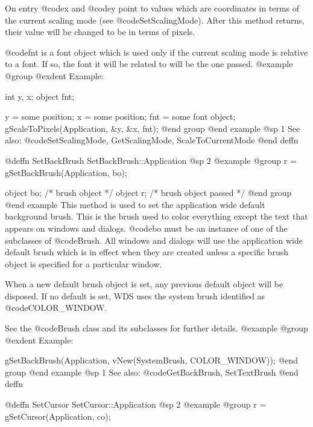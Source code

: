 On entry @code{x} and @code{y} point to values which are coordinates
in terms of the current scaling mode (see @code{SetScalingMode}).
After this method returns, their value will be changed to be in terms
of pixels.

@code{fnt} is a font object which is used only if the current scaling
mode is relative to a font.  If so, the font it will be related to
will be the one passed.
@example
@group
@exdent Example:

int     y, x;
object  fnt;

y = some position;
x = some position;
fnt = some font object;
gScaleToPixels(Application, &y, &x, fnt);
@end group
@end example
@sp 1
See also:  @code{SetScalingMode, GetScalingMode, ScaleToCurrentMode}
@end deffn
















@deffn {SetBackBrush} SetBackBrush::Application
@sp 2
@example
@group
r = gSetBackBrush(Application, bo);

object  bo;     /*  brush object         */
object  r;      /*  brush object passed  */
@end group
@end example
This method is used to set the application wide default background
brush.  This is the brush used to color everything except the text that
appears on windows and dialogs.  @code{bo} must be an instance of one of
the subclasses of @code{Brush}.  All windows and dialogs will use the
application wide default brush which is in effect when they are created
unless a specific brush object is specified for a particular window.

When a new default brush object is set, any previous default object
will be disposed.  If no default is set, WDS uses the system brush
identified as @code{COLOR_WINDOW}.

See the @code{Brush} class and its subclasses for further details.
@example
@group
@exdent Example:

gSetBackBrush(Application, vNew(SystemBrush, COLOR_WINDOW));
@end group
@end example
@sp 1
See also:  @code{GetBackBrush, SetTextBrush}
@end deffn












@deffn {SetCursor} SetCursor::Application
@sp 2
@example
@group
r = gSetCursor(Application, co);

